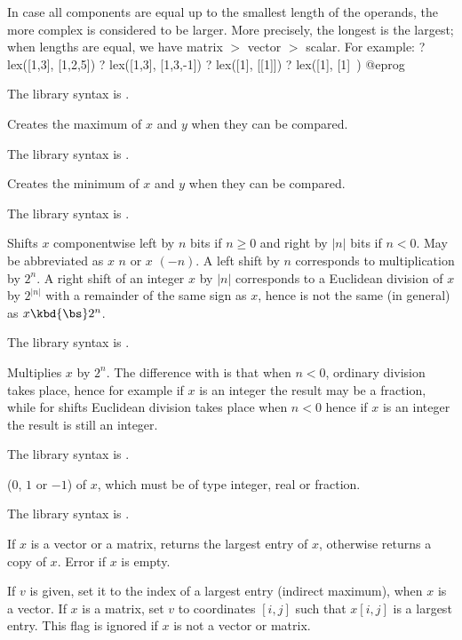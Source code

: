 In case all components are equal up to the smallest length of the operands,
the more complex is considered to be larger. More precisely, the longest is
the largest; when lengths are equal, we have matrix $>$ vector $>$ scalar.
For example:
\bprog
? lex([1,3], [1,2,5])
? lex([1,3], [1,3,-1])
? lex([1], [[1]])
? lex([1], [1]~)
@eprog

The library syntax is .

\label{se:max}
Creates the maximum of $x$ and $y$ when they can be compared.

The library syntax is .

\label{se:min}
Creates the minimum of $x$ and $y$ when they can be compared.

The library syntax is .

\label{se:shift}
Shifts $x$ componentwise left by $n$ bits if $n\ge0$ and right by $|n|$
bits if $n<0$. May be abbreviated as $x$ \kbd{<<} $n$ or $x$ \kbd{>>} $(-n)$.
A left shift by $n$ corresponds to multiplication by $2^n$. A right shift of an
integer $x$ by $|n|$ corresponds to a Euclidean division of $x$ by $2^{|n|}$
with a remainder of the same sign as $x$, hence is not the same (in general) as
$x \kbd{\bs} 2^n$.

The library syntax is .

\label{se:shiftmul}
Multiplies $x$ by $2^n$. The difference with
 is that when $n<0$, ordinary division takes place, hence for
example if $x$ is an integer the result may be a fraction, while for shifts
Euclidean division takes place when $n<0$ hence if $x$ is an integer the result
is still an integer.

The library syntax is .

\label{se:sign}
 ($0$, $1$ or $-1$) of $x$, which must be of
type integer, real or fraction.

The library syntax is .

\label{se:vecmax}
If $x$ is a vector or a matrix, returns the largest entry of $x$,
otherwise returns a copy of $x$. Error if $x$ is empty.

If $v$ is given, set it to the index of a largest entry (indirect maximum),
when $x$ is a vector. If $x$ is a matrix, set $v$ to coordinates $[i,j]$
such that $x[i,j]$ is a largest entry. This flag is ignored if $x$ is not a
vector or matrix.

